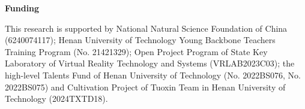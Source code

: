 \documentclass[11pt]{article}
\begin{document}
\begin{center}\textbf{Funding}\end{center}

This research is supported by National Natural Science Foundation of China (6240074117); Henan University of Technology Young Backbone Teachers Training Program (No. 21421329); Open Project Program of State Key Laboratory of Virtual Reality Technology and Systems (VRLAB2023C03); the high-level Talents Fund of Henan University of Technology (No. 2022BS076, No. 2022BS075) and Cultivation Project of Tuoxin Team in Henan University of Technology (2024TXTD18).
\end{document}
